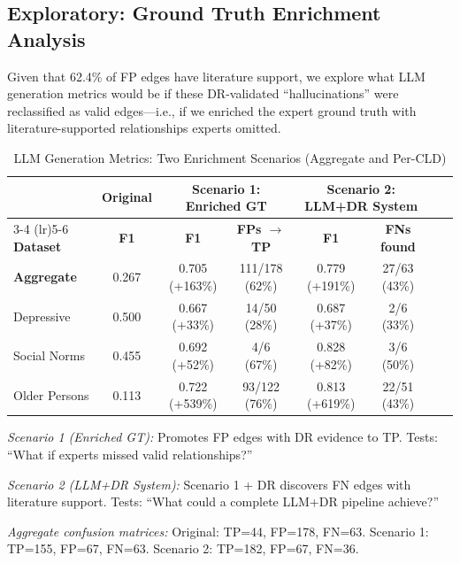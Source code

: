 \documentclass{article}
\begin{document}
\subsection{Exploratory: Ground Truth Enrichment Analysis}
\label{sec:gt_enrichment_results}

Given that 62.4\% of FP edges have literature support, we explore what LLM generation metrics would be if these DR-validated ``hallucinations'' were reclassified as valid edges---i.e., if we enriched the expert ground truth with literature-supported relationships experts omitted.

\begin{table}[H]
\centering
\caption{LLM Generation Metrics: Two Enrichment Scenarios (Aggregate and Per-CLD)}
\label{tab:enriched_gt}
\begin{threeparttable}
\footnotesize
\begin{tabular}{lccccccc}
\toprule
& \textbf{Original} & \multicolumn{2}{c}{\textbf{Scenario 1: Enriched GT}} & \multicolumn{2}{c}{\textbf{Scenario 2: LLM+DR System}} \\
\cmidrule(lr){3-4} \cmidrule(lr){5-6}
\textbf{Dataset} & \textbf{F1} & \textbf{F1} & \textbf{FPs $\to$ TP} & \textbf{F1} & \textbf{FNs found} \\
\midrule
\textbf{Aggregate} & 0.267 & 0.705 (+163\%) & 111/178 (62\%) & 0.779 (+191\%) & 27/63 (43\%) \\
\midrule
Depressive & 0.500 & 0.667 (+33\%) & 14/50 (28\%) & 0.687 (+37\%) & 2/6 (33\%) \\
Social Norms & 0.455 & 0.692 (+52\%) & 4/6 (67\%) & 0.828 (+82\%) & 3/6 (50\%) \\
Older Persons & 0.113 & 0.722 (+539\%) & 93/122 (76\%) & 0.813 (+619\%) & 22/51 (43\%) \\
\bottomrule
\end{tabular}
\begin{tablenotes}
\small
\item \textit{Scenario 1 (Enriched GT):} Promotes FP edges with DR evidence to TP. Tests: ``What if experts missed valid relationships?''
\item \textit{Scenario 2 (LLM+DR System):} Scenario 1 + DR discovers FN edges with literature support. Tests: ``What could a complete LLM+DR pipeline achieve?''
\item \textit{Aggregate confusion matrices:} Original: TP=44, FP=178, FN=63. Scenario 1: TP=155, FP=67, FN=63. Scenario 2: TP=182, FP=67, FN=36.
\end{tablenotes}
\end{threeparttable}
\end{table}
\end{document}
